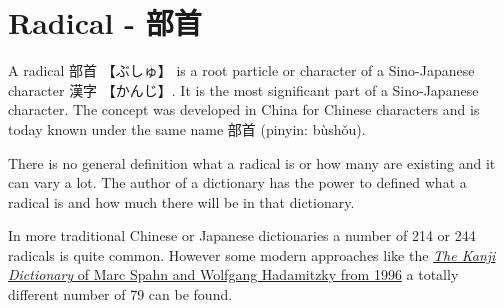\section{Radical - 部首} \label{sec:Radical}

A radical {部首} {【ぶしゅ】} is a root particle or character of a Sino-Japanese 
character {漢字} {【かんじ】}. It is the most significant part of a Sino-Japanese
character. The concept was developed in China for Chinese characters and is
today known under the same name {部首} (pinyin: bùshǒu).

There is no general definition what a radical is or how many are existing and it 
can vary a lot. The author of a dictionary has the power to defined what a radical
is and how much there will be in that dictionary.

In more traditional Chinese or Japanese dictionaries a number of 214 or 244
radicals is quite common. However some modern approaches like the
\href{http://www.hadamitzky.de/english/works_books.htm#KD}{\textit{The Kanji
Dictionary} of Marc Spahn and Wolfgang Hadamitzky from 1996} a totally
different number of 79 can be found.


